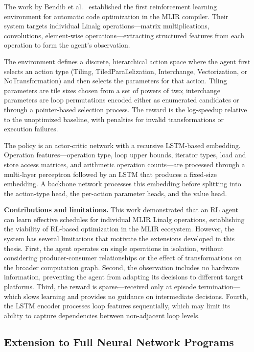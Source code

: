 The work by Bendib et al.~\cite{bendib2024reinforcement} established the first reinforcement learning environment for automatic code optimization in the MLIR compiler. Their system targets individual Linalg operations—matrix multiplications, convolutions, element-wise operations—extracting structured features from each operation to form the agent's observation.

The environment defines a discrete, hierarchical action space where the agent first selects an action type (Tiling, TiledParallelization, Interchange, Vectorization, or NoTransformation) and then selects the parameters for that action. Tiling parameters are tile sizes chosen from a set of powers of two; interchange parameters are loop permutations encoded either as enumerated candidates or through a pointer-based selection process. The reward is the log-speedup relative to the unoptimized baseline, with penalties for invalid transformations or execution failures.

The policy is an actor-critic network with a recursive LSTM-based embedding. Operation features—operation type, loop upper bounds, iterator types, load and store access matrices, and arithmetic operation counts—are processed through a multi-layer perceptron followed by an LSTM that produces a fixed-size embedding. A backbone network processes this embedding before splitting into the action-type head, the per-action parameter heads, and the value head.

\textbf{Contributions and limitations.} This work demonstrated that an RL agent can learn effective schedules for individual MLIR Linalg operations, establishing the viability of RL-based optimization in the MLIR ecosystem. However, the system has several limitations that motivate the extensions developed in this thesis. First, the agent operates on single operations in isolation, without considering producer-consumer relationships or the effect of transformations on the broader computation graph. Second, the observation includes no hardware information, preventing the agent from adapting its decisions to different target platforms. Third, the reward is sparse—received only at episode termination—which slows learning and provides no guidance on intermediate decisions. Fourth, the LSTM encoder processes loop features sequentially, which may limit its ability to capture dependencies between non-adjacent loop levels.

\subsection{Extension to Full Neural Network Programs}

